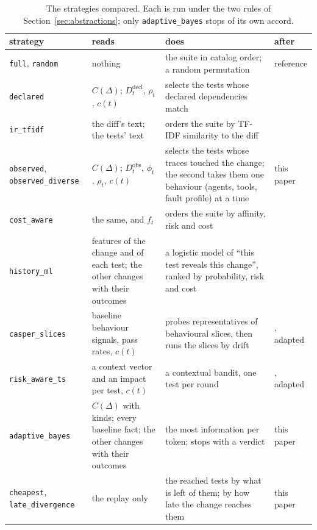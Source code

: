 \documentclass[11pt,a4paper]{article}
\newcommand{\strat}[1]{\texttt{#1}}
\begin{document}
\begin{table}[!htbp]
\centering\small
\caption{The strategies compared. Each is run under the two rules of Section~\ref{sec:abstractions}; only
\strat{adaptive\_bayes} stops of its own accord.}
\label{tab:strategies}
\setlength{\tabcolsep}{4pt}
\begin{tabular}{L{30mm}p{38mm}p{54mm}L{22mm}}
\toprule
strategy & reads & does & after \\
\midrule
\strat{full}, \strat{random} & nothing & the suite in catalog order; a random permutation & reference \\
\strat{declared} & $C(\Delta)$; $D^{\mathrm{decl}}_t$, $\rho_t$, $c(t)$ & selects the tests whose declared dependencies match & \cite{rothermel1997safe} \\
\strat{ir\_tfidf} & the diff's text; the tests' text & orders the suite by TF-IDF similarity to the diff & \cite{saha2015ir} \\
\strat{observed}, \strat{observed\_diverse} & $C(\Delta)$; $D^{\mathrm{obs}}_t$, $\phi_t$, $\rho_t$, $c(t)$ & selects the tests whose traces touched the change; the second takes them one behaviour (agents, tools, fault profile) at a time & this paper \\
\strat{cost\_aware} & the same, and $f_t$ & orders the suite by affinity, risk and cost & \cite{elbaum2001incorporating,memon2017taming} \\
\strat{history\_ml} & features of the change and of each test; the other changes with their outcomes & a logistic model of ``this test reveals this change'', ranked by probability, risk and cost & \cite{machalica2019predictive} \\
\strat{casper\_slices} & baseline behaviour signals, pass rates, $c(t)$ & probes representatives of behavioural slices, then runs the slices by drift & \cite{muse2026casper}, adapted \\
\strat{risk\_aware\_ts} & a context vector and an impact per test, $c(t)$ & a contextual bandit, one test per round & \cite{maji2026risk}, adapted \\
\strat{adaptive\_bayes} & $C(\Delta)$ with kinds; every baseline fact; the other changes with their outcomes & the most information per token; stops with a verdict & this paper \\
\strat{cheapest}, \strat{late\_divergence} & the replay only & the reached tests by what is left of them; by how late the change reaches them & this paper \\
\bottomrule
\end{tabular}
\end{table}
\end{document}
